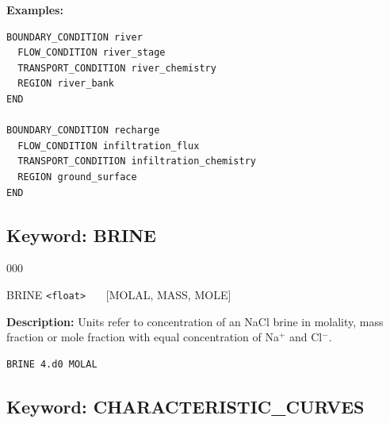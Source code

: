 \bigskip

\newpage
\begin{mdframed}

{\noindent\bf Examples:}
\footnotesize

\begin{verbatim}
BOUNDARY_CONDITION river
  FLOW_CONDITION river_stage
  TRANSPORT_CONDITION river_chemistry
  REGION river_bank
END

BOUNDARY_CONDITION recharge
  FLOW_CONDITION infiltration_flux
  TRANSPORT_CONDITION infiltration_chemistry
  REGION ground_surface
END
\end{verbatim}
\normalsize
\end{mdframed}

\hyperlink{target_key}{\return}


\newpage
\protect\hypertarget{target_brine}{}

\subsection{Keyword: BRINE}

\begin{deflist}{000}
\item[BRINE] {\tt <float>} \ \ \ [MOLAL, MASS, MOLE]
\end{deflist}

{\noindent\bf Description:}
Units refer to concentration of an NaCl brine in molality, mass fraction or mole fraction with equal concentration of Na$^+$ and Cl$^-$.

\hfill\hyperlink{target_key}{\return}

\begin{mdframed}
\footnotesize
\begin{verbatim}
BRINE 4.d0 MOLAL
\end{verbatim}
\normalsize
\end{mdframed}

\hyperlink{target_key}{\return}


\newpage
\protect\hypertarget{target_charcrv}{}

\subsection{Keyword: CHARACTERISTIC\_CURVES}

